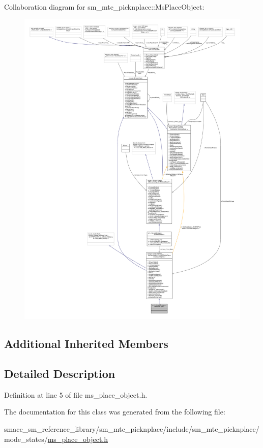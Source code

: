 Collaboration diagram for sm\+\_\+mtc\+\_\+picknplace\+:\+:Ms\+Place\+Object\+:
\nopagebreak
\begin{figure}[H]
\begin{center}
\leavevmode
\includegraphics[width=350pt]{classsm__mtc__picknplace_1_1MsPlaceObject__coll__graph}
\end{center}
\end{figure}
\subsection*{Additional Inherited Members}


\subsection{Detailed Description}


Definition at line 5 of file ms\+\_\+place\+\_\+object.\+h.



The documentation for this class was generated from the following file\+:\begin{DoxyCompactItemize}
\item 
smacc\+\_\+sm\+\_\+reference\+\_\+library/sm\+\_\+mtc\+\_\+picknplace/include/sm\+\_\+mtc\+\_\+picknplace/mode\+\_\+states/\hyperlink{ms__place__object_8h}{ms\+\_\+place\+\_\+object.\+h}\end{DoxyCompactItemize}
